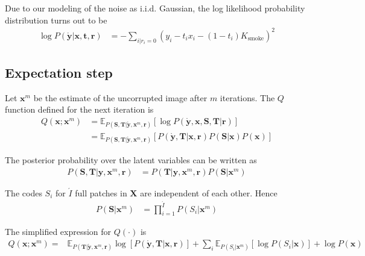 Due to our modeling of the noise as i.i.d. Gaussian, the log likelihood probability distribution turns out to be
\begin{align}
\log P \left( \mathbf{\mathring y}| \mathbf{x}, \mathbf{t}, \mathbf{r} \right) &= - \sum_{i | r_i = 0} \left( y_i - t_i x_i - (1-t_i) K_\text{smoke} \right)^2
\end{align}


\subsection{Expectation step}
Let $\mathbf{x}^m$ be the estimate of the uncorrupted image after $m$ iterations. The $Q$ function defined for the next iteration is
\begin{align}
Q(\mathbf{x}; \mathbf{x}^m) &= \mathbb{E}_{ P \left( \mathbf{S}, \mathbf{T} | \mathbf{\mathring y}, \mathbf{x}^m, \mathbf{r} \right)} \left[ \log P \left( \mathbf{\mathring y}, \mathbf{x}, \mathbf{S}, \mathbf{T} | \mathbf{r} \right)\right] \nonumber \\
&= \mathbb{E}_{ P \left( \mathbf{S}, \mathbf{T} | \mathbf{\mathring y}, \mathbf{x}^m, \mathbf{r} \right)} \left[ P \left( \mathbf{\mathring y}, \mathbf{T}| \mathbf{x}, \mathbf{r} \right) P \left( \mathbf{S} | \mathbf{x} \right) P \left( \mathbf{x} \right) \right] \label{eqn:Qvbem2}
\end{align}

The posterior probability over the latent variables can be written as
\begin{align}
P \left( \mathbf{S}, \mathbf{T} | \mathbf{y}, \mathbf{x}^m, \mathbf{r} \right) &= P \left( \mathbf{T} | \mathbf{y}, \mathbf{x}^m, \mathbf{r} \right) P \left( \mathbf{S} | \mathbf{x}^m \right) \label{eqn:latentPosterior}
\end{align}

The codes $S_i$ for $\acute{I}$ full patches in $\mathbf{X}$ are independent of each other. Hence
\begin{align}
P \left( \mathbf{S} | \mathbf{x}^m\right) &= \prod_{i=1}^{\acute{I}} P \left( S_i | \mathbf{x}^m \right) \label{eqn:obCodeFact} 
\end{align}

The simplified expression for $Q\left( \cdot \right)$ is
\begin{align}
Q(\mathbf{x}; \mathbf{x}^m) = &\mathbb{E}_{ P \left( \mathbf{T} | \mathbf{\mathring y}, \mathbf{x}^m, \mathbf{r} \right)} \log \left[ P \left( \mathbf{\mathring y}, \mathbf{T} | \mathbf{x}, \mathbf{r} \right) \right] 
+ \sum_i \mathbb{E}_{ P \left( S_i | \mathbf{x}^m \right)} \left[ \log P \left( S_i | \mathbf{x} \right) \right]
+ \log P \left( \mathbf{x} \right) \label{eqn:QSimplified} 
\end{align}


